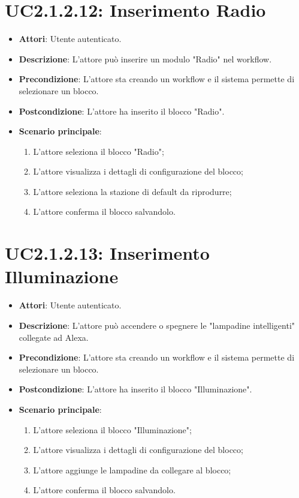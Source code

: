 \section{UC2.1.2.12: Inserimento Radio}
\label{UC2.1.2.12}
\begin{itemize}
	\item \textbf{Attori}: Utente autenticato.
	\item \textbf{Descrizione}: L'attore può inserire un modulo "Radio" nel workflow.
	\item \textbf{Precondizione}: L'attore sta creando un workflow e il sistema permette di selezionare un blocco.
	\item \textbf{Postcondizione}: L'attore ha inserito il blocco "Radio".
	\item \textbf{Scenario principale}:
	\begin{enumerate} \item L'attore seleziona il blocco "Radio"; \item L'attore visualizza i dettagli di configurazione del blocco; \item  L'attore seleziona la stazione di default da riprodurre; \item L'attore conferma il blocco salvandolo.\end{enumerate}
\end{itemize}

\section{UC2.1.2.13: Inserimento Illuminazione}
\label{UC2.1.2.13}
\begin{itemize}
	\item \textbf{Attori}: Utente autenticato.
	\item \textbf{Descrizione}: L'attore può accendere o spegnere le "lampadine intelligenti" collegate ad Alexa.
	\item \textbf{Precondizione}: L'attore sta creando un workflow e il sistema permette di selezionare un blocco.
	\item \textbf{Postcondizione}: L'attore ha inserito il blocco "Illuminazione".
	\item \textbf{Scenario principale}:
	\begin{enumerate} \item L'attore seleziona il blocco "Illuminazione"; \item L'attore visualizza i dettagli di configurazione del blocco; \item  L'attore aggiunge le lampadine da collegare al blocco; \item L'attore conferma il blocco salvandolo.\end{enumerate}
\end{itemize}

